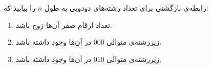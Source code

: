 \EXERCISE
رابطه‌ی بازگشتی برای تعداد رشته‌های دودویی به طول
$n$
را بیابید که:
\begin{enumerate}
\item
تعداد ارقام صفر آن‌ها زوج باشد.
\item
زیررشته‌ی متوالی
$000$
در آن‌ها وجود داشته باشد.
\item
زیررشته‌ی متوالی
$010$
در آن‌ها وجود داشته باشد.
\end{enumerate}